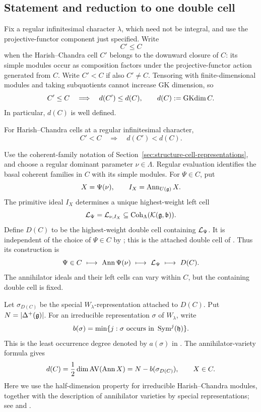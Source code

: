 \subsection{Statement and reduction to one double cell}

Fix a regular infinitesimal character $\lambda$, which need not be
integral, and use the projective-functor component just specified. Write
\[
  C'\leq C
\]
when the Harish--Chandra cell $C'$ belongs to the downward closure of $C$:
its simple modules occur as composition factors under the projective-functor
action generated from $C$. Write $C'<C$ if also $C'\neq C$. Tensoring with
finite-dimensional modules and taking subquotients cannot increase GK
dimension, so
\[
  C'\leq C\quad\Longrightarrow\quad d(C')\leq d(C),
  \qquad d(C):=\operatorname{GKdim} C.
\]
In particular, $d(C)$ is well defined.

\begin{thm}\label{thm:strict-gk-drop}
For Harish--Chandra cells at a regular infinitesimal character,
\[
  \boxed{C'<C\quad\Longrightarrow\quad d(C')<d(C).}
\]
\end{thm}

\begin{defn}\label{def:strict-drop-double-cell}
Use the coherent-family notation of
Section~\ref{sec:structure-cell-representations}, and choose a regular
dominant parameter $\nu\in\Lambda$. Regular evaluation identifies the basal
coherent families in $C$ with its simple modules. For $\Psi\in C$, put
\[
  X=\Psi(\nu),\qquad I_X=\operatorname{Ann}_{U(\mathfrak{g})}X.
\]
The primitive ideal $I_X$ determines a unique highest-weight left cell
\[
  \mathcal{L}_\Psi=\mathcal{L}_{\nu,I_X}
  \subseteq\operatorname{Coh}_\Lambda(\mathcal K(\mathfrak{g},\mathfrak{b})).
\]
Define $D(C)$ to be the highest-weight double cell containing $\mathcal{L}_\Psi$.
It is independent of the choice of $\Psi\in C$ by
\cite[Lem.~4.12]{BMSZ22}; this is the attached double cell of
\cite[Def.~4.13]{BMSZ22}. Thus its construction is
\[
  \Psi\in C\ \longmapsto\ \operatorname{Ann}\Psi(\nu)
  \ \longmapsto\ \mathcal{L}_\Psi\ \longmapsto\ D(C).
\]
The annihilator ideals and their left cells can vary within $C$, but the
containing double cell is fixed.
\end{defn}

Let $\sigma_{D(C)}$ be the special $W_\lambda$-representation attached to
$D(C)$. Put $N=|\Delta^+(\mathfrak{g})|$. For an irreducible
representation $\sigma$ of $W_\lambda$, write
\[
  b(\sigma)=\min\{j:\sigma\text{ occurs in }\operatorname{Sym}^j(\mathfrak{h})\}.
\]
This is the least occurrence degree denoted by $a(\sigma)$ in
\cite[\S3.6]{BMSZ22}. The annihilator-variety formula gives
\begin{equation}\label{eq:strict-drop-dimension}
  d(C)=\frac12\dim\operatorname{AV}(\operatorname{Ann} X)
      =N-b(\sigma_{D(C)}),\qquad X\in C.
\end{equation}
Here we use the half-dimension property for irreducible Harish--Chandra
modules, together with the description of annihilator varieties by special
representations; see \cite{Vogan1978} and
\cite[Prop.~3.26]{BMSZ22}.

